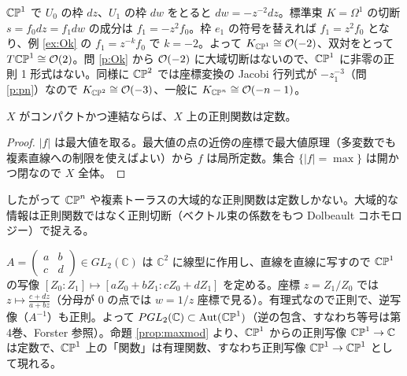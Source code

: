 \begin{center}
\end{center}
\begin{ex}[標準束と接束：$\CP^1$]\label{ex:KP1}\tP
$\CP^1$ で $U_0$ の枠 $dz$、$U_1$ の枠 $dw$ をとると $dw=-z^{-2}dz$。標準束 $K=\Omega^1$ の切断 $s=f_0dz=f_1dw$ の成分は $f_1=-z^2f_0$。枠 $e_1$ の符号を替えれば $f_1=z^2f_0$ となり、例 \ref{ex:Ok} の $f_1=z^{-k}f_0$ で $k=-2$。よって $K_{\mathbb{CP}^1}\cong\mathcal O(-2)$、双対をとって $T\mathbb{CP}^1\cong\mathcal O(2)$。問 \ref{p:Ok} から $\mathcal O(-2)$ に大域切断はないので、$\CP^1$ に非零の正則 1 形式はない。同様に $\mathbb{CP}^2$ では座標変換の Jacobi 行列式が $-z_1^{-3}$（問 \ref{p:pn}）なので $K_{\mathbb{CP}^2}\cong\mathcal O(-3)$、一般に $K_{\mathbb{CP}^n}\cong\mathcal O(-n-1)$。
\end{ex}


\begin{prop}[コンパクト複素多様体上の正則関数]\label{prop:maxmod}
$X$ がコンパクトかつ連結ならば、$X$ 上の正則関数は定数。
\end{prop}
\begin{proof}
$|f|$ は最大値を取る。最大値の点の近傍の座標で最大値原理（多変数でも複素直線への制限を使えばよい）から $f$ は局所定数。集合 $\{|f|=\max\}$ は開かつ閉なので $X$ 全体。\qedhere
\end{proof}
したがって $\mathbb{CP}^n$ や複素トーラスの大域的な正則関数は定数しかない。大域的な情報は正則関数ではなく正則切断（ベクトル束の係数をもつ Dolbeault コホモロジー）で捉える。


\begin{ex}[Möbius 変換]\label{ex:mobius}
$A=\begin{pmatrix}a&b\\c&d\end{pmatrix}\in GL_2(\mathbb C)$ は $\mathbb C^2$ に線型に作用し、直線を直線に写すので $\CP^1$ の写像 $[Z_0:Z_1]\mapsto[aZ_0+bZ_1:cZ_0+dZ_1]$ を定める。座標 $z=Z_1/Z_0$ では $z\mapsto\frac{c+dz}{a+bz}$（分母が $0$ の点では $w=1/z$ 座標で見る）。有理式なので正則で、逆写像（$A^{-1}$）も正則。よって $PGL_2(\mathbb C)\subset\mathrm{Aut}(\mathbb{CP}^1)$（逆の包含、すなわち等号は第4巻、Forster 参照\tC）。命題 \ref{prop:maxmod} より、$\CP^1$ からの正則写像 $\mathbb{CP}^1\to\mathbb C$ は定数で、$\CP^1$ 上の「関数」は有理関数、すなわち正則写像 $\mathbb{CP}^1\to\mathbb{CP}^1$ として現れる。
\end{ex}

